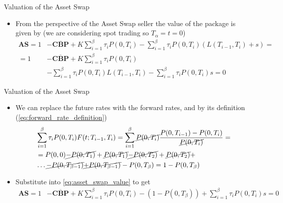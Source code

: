 \documentclass{beamer}
\begin{document}
\begin{frame}{Valuation of the Asset Swap}
	\begin{itemize}
		\item From the perspective of the Asset Swap seller the value of the package is given by (we are considering spot trading so $T_\alpha = t = 0$)
		\begin{equation}
			\begin{aligned}
				\textbf{AS}=1&-\overline{\textbf{CBP}}+K\sum_{i=1}^{\beta}\tau_i P(0,T_i)-\sum_{i=1}^{\beta}\tau_i P(0,T_i)(L(T_{i-1},T_i)+s) =\\
				=1&-\overline{\textbf{CBP}}+K\sum_{i=1}^{\beta}\tau_i P(0,T_i)\\
				&-\sum_{i=1}^{\beta}\tau_i P(0,T_i)L(T_{i-1},T_i)-\sum_{i=1}^{\beta}\tau_i P(0,T_i)s=0
			\end{aligned}
			\label{eq:asset_swap_value}
		\end{equation}
	\end{itemize}
\end{frame}

\begin{frame}{Valuation of the Asset Swap}
	\begin{itemize}
		\item We can replace the future rates with the forward rates, and by its definition (\cref{eq:forward_rate_definition})
		\begin{equation*}
			\begin{aligned}
			&\sum_{i=1}^\beta \tau_i P(0,T_i)F(t;T_{i-1},T_i) =  \sum_{i=1}^\beta \cancel{P(0,T_i)}\frac{P(0,T_{i-1})-P(0,T_i)}{\cancel{P(0,T_i)}} = \\
			&= P(0,0) \cancel{- P(0,T_1)} + \cancel{P(0,T_1)} \cancel{- P(0,T_2)} + \cancel{P(0,T_2)} + \\
			&\ldots \cancel{- P(0, T_{\beta-1})} \cancel{+ P(0, T_{\beta-1})}-P(0,T_\beta) = 1-P(0,T_\beta) 
			\end{aligned}
		\end{equation*}
		\item Substitute into \cref{eq:asset_swap_value} to get
		\begin{equation*}
			\begin{aligned}
				\textbf{AS}=1&-\overline{\textbf{CBP}}+K\sum_{i=1}^{\beta}\tau_i P(0,T_i) -(1-P(0,T_\beta))
				+ \sum_{i=1}^\beta\tau_i P(0,T_i)s=0
			\end{aligned}
		\end{equation*}
	\end{itemize}
\end{frame}
\end{document}
